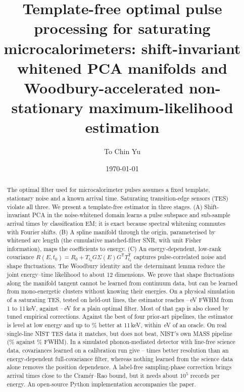 \documentclass[aps,prapplied,reprint,superscriptaddress,longbibliography,nofootinbib]{revtex4-2}
\theoremstyle{remark}
\newcommand{\T}{\mathsf{T}}
\begin{document}
\title{Template-free optimal pulse processing for saturating microcalorimeters:
shift-invariant whitened PCA manifolds and Woodbury-accelerated non-stationary
maximum-likelihood estimation}
\author{To Chin Yu}
\date{\today}

\begin{abstract}
The optimal filter used for microcalorimeter pulses assumes a fixed template,
stationary noise and a known arrival time. Saturating transition-edge sensors
(TES) violate all three. We present a template-free estimator in three stages.
(A) Shift-invariant PCA in the noise-whitened domain learns a pulse subspace and
sub-sample arrival times by classification EM; it is exact because spectral
whitening commutes with Fourier shifts. (B) A spline manifold through the origin,
parameterised by whitened arc length (the cumulative matched-filter SNR, with unit
Fisher information), maps the coefficients to energy. (C) An energy-dependent,
low-rank covariance $R(E,t_0)=R_0+T_{t_0}G\Sigma(E)G^\T T_{t_0}^\T$ captures
pulse-correlated noise and shape fluctuations. The Woodbury identity and the
determinant lemma reduce the joint energy--time likelihood to about 12 dimensions.
We prove that shape fluctuations along the manifold tangent cannot be learned from
continuum data, but can be learned from mono-energetic clusters without knowing
their energies. On a physical simulation of a saturating TES, tested on held-out
lines, the estimator reaches \resLinesLo--\resLinesHi\,eV FWHM from 1 to 11\,keV,
against \resOFLo--\resOFHi\,eV for a plain optimal filter. Most of that gap is also
closed by tuned empirical corrections. Against the best of four prior-art
pipelines, the estimator is level at low energy and up to \impBestTopMorph\% better
at 11\,keV, within \oracleGap\,eV of an oracle. On real single-line NIST TES data it
matches, but does not beat, NIST's own MASS pipeline (\realOursDrift\% against
\realMassATS\% FWHM). In a simulated phonon-mediated detector with
line-free science data, covariances learned on a calibration run give
\phGainCovMin--\phGainCovMax{} times better resolution than an energy-dependent
full-covariance filter, whereas nothing learned from the science data alone
removes the position dependence. A label-free sampling-phase correction brings arrival times close to the
Cramér--Rao bound, but it needs about $10^5$ records per energy. An
open-source Python implementation accompanies the paper.
\end{abstract}

\maketitle
\end{document}
